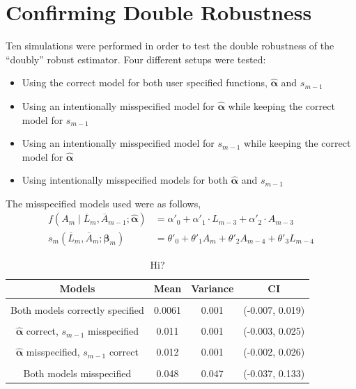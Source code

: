 \section{Confirming Double Robustness} 
Ten simulations were performed in order to test the double robustness of the ``doubly'' robust estimator.  Four different setups were tested: 
\begin{itemize} 
\item Using the correct model for both user specified functions, $\hat{\mathbf{\alpha}}$ and $s_{m-1}$ 
\item Using an intentionally misspecified model for $\hat{\mathbf{\alpha}}$ while keeping the correct model for $s_{m-1}$ 
\item Using an intentionally misspecified model for $s_{m-1}$ while keeping the correct model for $\hat{\mathbf{\alpha}}$
\item Using intentionally misspecified models for both $\hat{\mathbf{\alpha}}$ and $s_{m-1}$ 
\end{itemize} 

The misspecified models used were as follows, 
\begin{align} 
f(A_m \mid \overline{L}_m, \overline{A}_{m-1}; \hat{\mathbf{\alpha}}) &= \alpha'_{0} + \alpha'_{1} \cdot L_{m-3} + \alpha'_{2} \cdot A_{m-3} \\ 
s_{m}(\overline{L}_{m}, \overline{A}_{m};\mathbf{\beta}_{m}) &= \theta'_0 + \theta'_1 A_{m} +\theta'_2 A_{m-4} + \theta'_3 L_{m-4} 
 \end{align} 

\begin{table}[h!]
\centering
\begin{tabular} {c | c  c c}
Models & Mean & Variance & CI \\ 
\hline  \\
Both models correctly specified & 0.0061 & 0.001& (-0.007, 0.019)\\ \\
$\hat{\mathbf{\alpha}}$ correct, $s_{m-1}$ misspecified & 0.011 & 0.001& (-0.003, 0.025)\\ \\
$\hat{\mathbf{\alpha}}$ misspecified, $s_{m-1}$ correct & 0.012 & 0.001& (-0.002, 0.026) \\ \\
Both models misspecified & 0.048 & 0.047 & (-0.037, 0.133) 
\end{tabular} \\
\centering
\caption{Hi?}
\end{table}

